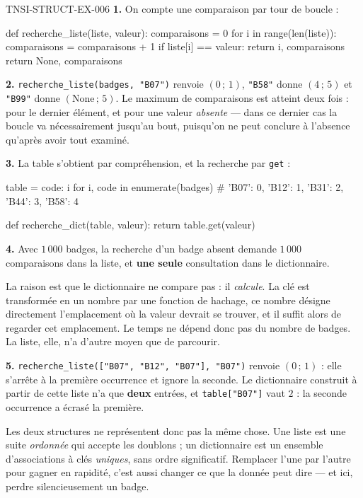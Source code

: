 \begin{corrige}{TNSI-STRUCT-EX-006}
\textbf{1.} On compte une comparaison par tour de boucle :
\begin{python}
def recherche_liste(liste, valeur):
    comparaisons = 0
    for i in range(len(liste)):
        comparaisons = comparaisons + 1
        if liste[i] == valeur:
            return i, comparaisons
    return None, comparaisons
\end{python}

\textbf{2.} \lstinline{recherche_liste(badges, "B07")} renvoie
$(0\,;\,1)$, \lstinline{"B58"} donne $(4\,;\,5)$ et \lstinline{"B99"} donne
$(\text{None}\,;\,5)$. Le maximum de comparaisons est atteint deux fois : pour
le dernier élément, et pour une valeur \emph{absente} — dans ce dernier cas la
boucle va nécessairement jusqu'au bout, puisqu'on ne peut conclure à l'absence
qu'après avoir tout examiné.

\textbf{3.} La table s'obtient par compréhension, et la recherche par
\lstinline{get} :
\begin{python}
table = {code: i for i, code in enumerate(badges)}
# {'B07': 0, 'B12': 1, 'B31': 2, 'B44': 3, 'B58': 4}

def recherche_dict(table, valeur):
    return table.get(valeur)
\end{python}

\textbf{4.} Avec $1\,000$ badges, la recherche d'un badge absent demande
$1\,000$ comparaisons dans la liste, et \textbf{une seule} consultation dans le
dictionnaire.

La raison est que le dictionnaire ne compare pas : il \emph{calcule}. La clé est
transformée en un nombre par une fonction de hachage, ce nombre désigne
directement l'emplacement où la valeur devrait se trouver, et il suffit alors de
regarder cet emplacement. Le temps ne dépend donc pas du nombre de badges. La
liste, elle, n'a d'autre moyen que de parcourir.

\textbf{5.} \lstinline{recherche_liste(["B07", "B12", "B07"], "B07")} renvoie
$(0\,;\,1)$ : elle s'arrête à la première occurrence et ignore la seconde. Le
dictionnaire construit à partir de cette liste n'a que \textbf{deux} entrées, et
\lstinline{table["B07"]} vaut $2$ : la seconde occurrence a écrasé la première.

Les deux structures ne représentent donc pas la même chose. Une liste est une
suite \emph{ordonnée} qui accepte les doublons ; un dictionnaire est un ensemble
d'associations à clés \emph{uniques}, sans ordre significatif. Remplacer l'une
par l'autre pour gagner en rapidité, c'est aussi changer ce que la donnée peut
dire — et ici, perdre silencieusement un badge.
\end{corrige}
